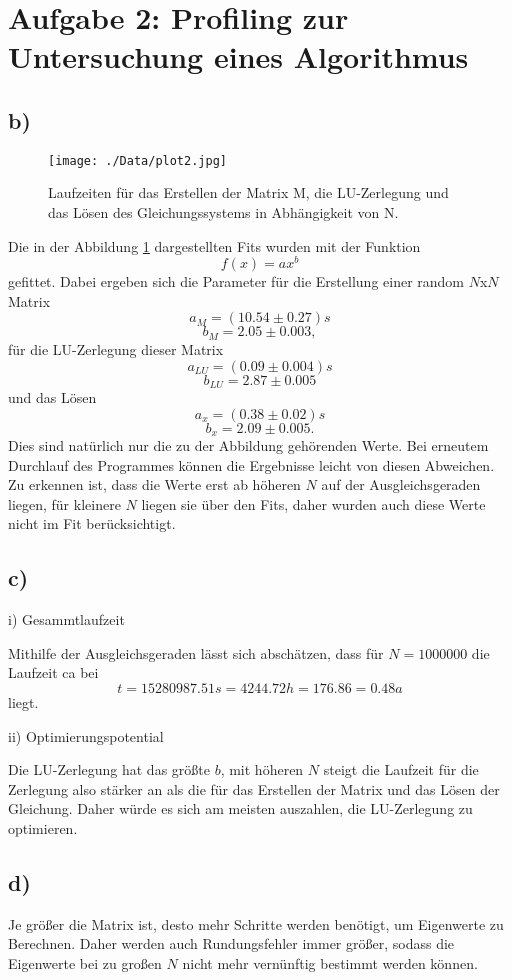 \section*{Aufgabe 2: Profiling zur Untersuchung eines Algorithmus}

\subsection*{b)}

  \begin{figure}
    \texttt{[image: ./Data/plot2.jpg]}
    \caption{Laufzeiten für das Erstellen der Matrix M, die LU-Zerlegung und das Lösen des Gleichungssystems in Abhängigkeit von N.}
    \label{fig:A2}
  \end{figure}

  \noindent Die in der Abbildung \ref{fig:A2} dargestellten Fits wurden mit der Funktion
  \begin{equation}
    f(x)=a x^b
  \end{equation}
  gefittet. Dabei ergeben sich die Parameter für die Erstellung einer random $N$x$N$ Matrix
  $$a_M = (10.54 \pm 0.27) s$$
  $$b_M = 2.05 \pm 0.003 ,$$
  für die LU-Zerlegung dieser Matrix
  $$a_{LU} = (0.09 \pm 0.004) s$$
  $$b_{LU} = 2.87 \pm 0.005$$
  und das Lösen
  $$a_x = (0.38 \pm 0.02) s$$
  $$b_x = 2.09 \pm 0.005.$$
  Dies sind natürlich nur die zu der Abbildung gehörenden Werte. Bei erneutem Durchlauf des Programmes
  können die Ergebnisse leicht von diesen Abweichen. Zu erkennen ist, dass die Werte erst ab höheren $N$
  auf der Ausgleichsgeraden liegen, für kleinere $N$ liegen sie über den Fits, daher wurden auch diese
  Werte nicht im Fit berücksichtigt.

  \subsection*{c)}

    \noindent i) Gesammtlaufzeit

    \noindent Mithilfe der Ausgleichsgeraden lässt sich abschätzen, dass für $N=1000000$
    die Laufzeit ca bei
    $$t= 15280987.51 s =  4244.72 h = 176.86 = 0.48 a$$
    liegt.

    \noindent ii) Optimierungspotential

    \noindent Die LU-Zerlegung hat das größte $b$, mit höheren $N$ steigt die Laufzeit für die Zerlegung
    also stärker an als die für das Erstellen der Matrix und das Lösen der Gleichung. Daher
    würde es sich am meisten auszahlen, die LU-Zerlegung zu optimieren.


  \subsection*{d)}

    \noindent Je größer die Matrix ist, desto mehr Schritte werden benötigt, um Eigenwerte zu Berechnen. Daher
    werden auch Rundungsfehler immer größer, sodass die Eigenwerte bei zu großen $N$ nicht mehr vernünftig bestimmt
    werden können.
